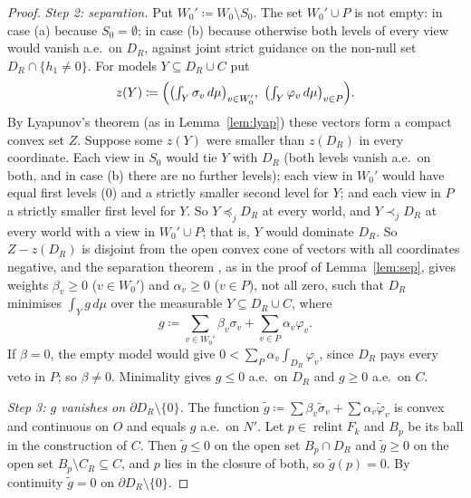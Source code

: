 \documentclass[11pt]{article}
\DeclareMathOperator{\relint}{relint}
\theoremstyle{plain}
\theoremstyle{definition}
\theoremstyle{remark}
\begin{document}
\begin{proof}
\emph{Step 2: separation.} Put $W_0'\coloneqq W_0\setminus S_0$. The set $W_0'\cup P$ is
not empty: in case (a) because $S_0=\emptyset$; in case (b) because otherwise both levels
of every view would vanish a.e.\ on $D_R$, against joint strict guidance on the non-null
set $D_R\cap\{h_1\ne0\}$. For models $Y\subseteq D_R\cup C$ put
\[
  z(Y)\coloneqq\Bigl(\bigl(\textstyle\int_Y\sigma_v\,d\mu\bigr)_{v\in W_0'},\
  \bigl(\textstyle\int_Y\varphi_v\,d\mu\bigr)_{v\in P}\Bigr).
\]
By Lyapunov's theorem (as in Lemma~\ref{lem:lyap}) these vectors form a compact convex set
$Z$. Suppose some $z(Y)$ were smaller than $z(D_R)$ in every coordinate. Each view in
$S_0$ would tie $Y$ with $D_R$ (both levels vanish a.e.\ on both, and in case (b) there are
no further levels); each view in $W_0'$ would have equal first levels ($0$) and a strictly
smaller second level for $Y$; and each view in $P$ a strictly smaller first level for $Y$.
So $Y\preceq_jD_R$ at every world, and $Y\prec_jD_R$ at every world with a view in
$W_0'\cup P$; that is, $Y$ would dominate $D_R$. So $Z-z(D_R)$ is disjoint from the open
convex cone of vectors with all coordinates negative, and the separation theorem
\cite[Thm.~11.3]{Rockafellar}, as in the proof of Lemma~\ref{lem:sep}, gives weights
$\beta_v\ge0$ ($v\in W_0'$) and $\alpha_v\ge0$ ($v\in P$), not all zero, such that $D_R$
minimises $\int_Yg\,d\mu$ over the measurable $Y\subseteq D_R\cup C$, where
\[
  g\coloneqq\sum_{v\in W_0'}\beta_v\sigma_v+\sum_{v\in P}\alpha_v\varphi_v .
\]
If $\beta=0$, the empty model would give $0<\sum_P\alpha_v\int_{D_R}\varphi_v$, since $D_R$
pays every veto in $P$; so $\beta\ne0$. Minimality gives $g\le0$ a.e.\ on $D_R$ and $g\ge0$
a.e.\ on $C$.

\emph{Step 3: $g$ vanishes on $\partial D_R\setminus\{0\}$.} The function $\tilde g
\coloneqq\sum\beta_v\tilde\sigma_v+\sum\alpha_v\tilde\varphi_v$ is convex and continuous on
$O$ and equals $g$ a.e.\ on $N'$. Let $p\in\relint F_k$ and $B_p$ be its ball in the
construction of $C$. Then $\tilde g\le0$ on the open set $B_p\cap D_R$ and $\tilde g\ge0$
on the open set $B_p\setminus C_R\subseteq C$, and $p$ lies in the closure of both, so
$\tilde g(p)=0$. By continuity $\tilde g=0$ on $\partial D_R\setminus\{0\}$.


\end{proof}
\end{document}
